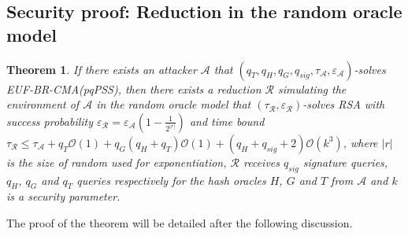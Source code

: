 \documentclass[a4paper,11pt]{article}
\newtheorem{theorem}{Theorem}[section]
\begin{document}
\subsection{Security proof: Reduction in the random oracle model}\label{sec:two:2}
\begin{theorem}
\label{theorem1}
If there exists an attacker $\mathcal{A}$ that $(q_{T}, q_{H}, q_{G} , q_{sig} , \tau_{\mathcal{A}} ,\varepsilon_{\mathcal{A}} )$-solves EUF-BR-CMA(pqPSS), then there exists a reduction $\mathcal{R}$ simulating the environment of $\mathcal{A}$ in the random oracle model that $(\tau_{\mathcal{R}} ,\varepsilon_{\mathcal{R}} )$-solves RSA with  success  probability $\varepsilon_{\mathcal{R}} = \varepsilon_{\mathcal{A}}(1-\frac{1}{2^{|r|}}) $   and time bound $\tau_{\mathcal{R}}\leq \tau_{\mathcal{A}} + q_{T}\mathcal{O}(1) + q_{G}(q_{H}+q_{T})\mathcal{O}(1)+ (q_{H}+q_{sig}+2)\mathcal{O}(k^{3})$, where $|r|$ is the size of random  used for exponentiation,  $\mathcal{R}$ receives $q_{sig}$ signature queries, $q_{H}$, $q_{G}$ and $q_{T}$  queries respectively for the hash oracles $H$, $G$ and $T$ from  $\mathcal{A}$ and  $k$ is a security parameter.

\end{theorem}

The proof of the theorem will be detailed after the following discussion.
\end{document}
